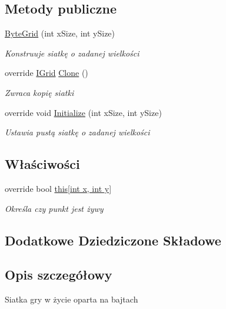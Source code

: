 \subsection*{Metody publiczne}
\begin{DoxyCompactItemize}
\item 
\hyperlink{class_convay_1_1_core_1_1_byte_grid_a93744df4805647b20c435659ba40a6a5}{Byte\+Grid} (int x\+Size, int y\+Size)
\begin{DoxyCompactList}\small\item\em Konstruuje siatkę o zadanej wielkości \end{DoxyCompactList}\item 
override \hyperlink{interface_convay_1_1_core_1_1_interfaces_1_1_i_grid}{I\+Grid} \hyperlink{class_convay_1_1_core_1_1_byte_grid_aff3101705112bb6f708d694b34a7e5f2}{Clone} ()
\begin{DoxyCompactList}\small\item\em Zwraca kopię siatki \end{DoxyCompactList}\item 
override void \hyperlink{class_convay_1_1_core_1_1_byte_grid_a75128576734ebd27f9b469ed0f7aaeee}{Initialize} (int x\+Size, int y\+Size)
\begin{DoxyCompactList}\small\item\em Ustawia pustą siatkę o zadanej wielkości \end{DoxyCompactList}\end{DoxyCompactItemize}
\subsection*{Właściwości}
\begin{DoxyCompactItemize}
\item 
override bool \hyperlink{class_convay_1_1_core_1_1_byte_grid_ae80450d07296d3c4980ab27b9d0ef03b}{this\mbox{[}int x, int y\mbox{]}}
\begin{DoxyCompactList}\small\item\em Określa czy punkt jest żywy \end{DoxyCompactList}\end{DoxyCompactItemize}
\subsection*{Dodatkowe Dziedziczone Składowe}


\subsection{Opis szczegółowy}
Siatka gry w życie oparta na bajtach 



